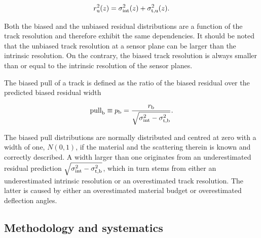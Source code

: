 \begin{equation}
r_{\textrm{u}}^2(z) = \sigma_{\textrm{int}}^2(z) + \sigma_{\textrm{t,u}}^2(z).
\label{eq:telescoperesolutionequation2} 
\end{equation}

\noindent
Both the biased and the unbiased residual distributions are a function of the track resolution and therefore exhibit the same dependencies.
It should be noted that the unbiased track resolution at a sensor plane can be larger than the intrinsic resolution. 
On the contrary, the biased track resolution is always smaller than or equal to the intrinsic resolution of the sensor planes. 

The biased pull of a track is defined as the ratio of the biased residual over the predicted biased residual width

\begin{equation}
 \textrm{pull}_{\textrm{b}} \equiv p_{\textrm{b}} = \frac{r_{\textrm{b}}}{\sqrt{\sigma_{\textrm{int}}^2 - \sigma_{\textrm{t,b}}^2}}.
 \label{eq:pull}
\end{equation}

\noindent
The biased pull distributions are normally distributed and centred at zero with a width of one, $N(0,1)$, if the material and the scattering therein is known and correctly described. 
A width larger than one originates from an underestimated residual prediction $\sqrt{\sigma_{\textrm{int}}^2 - \sigma_{\textrm{t,b}}^2}$, which in turn stems from either an underestimated intrinsic resolution
 or an overestimated track resolution. 
The latter is caused by either an overestimated material budget or overestimated deflection angles. 


\subsection{Methodology and systematics}
\label{sec:meth}

